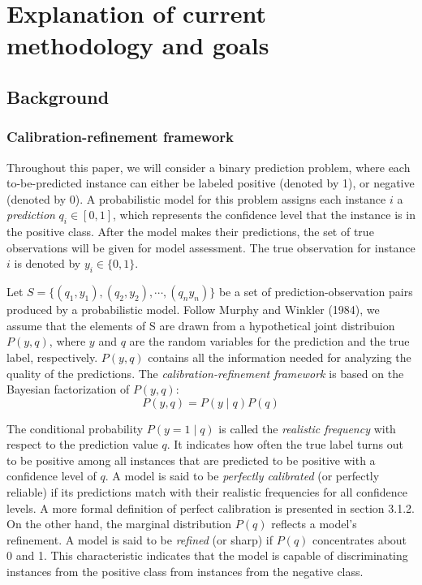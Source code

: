 \chapter{Explanation of current methodology and goals}
\section{Background}

\subsection{Calibration-refinement framework}

Throughout this paper, we will consider a binary prediction problem, where each to-be-predicted instance can either be labeled positive (denoted by 1), or negative (denoted by 0). A probabilistic model for this problem assigns each instance $i$ a \textit{prediction} $q_i \in [0, 1]$, which represents the confidence level that the instance is in the positive class. After the model makes their predictions, the set of true observations will be given for model assessment. The true observation for instance $i$ is denoted by $y_i \in \{0, 1\}$.  

Let $S = \{(q_1, y_1), (q_2, y_2), \cdots, (q_n y_n)\}$ be a set of prediction-observation pairs produced by a probabilistic model. Follow Murphy and Winkler (1984), we assume that the elements of S are drawn from a hypothetical joint distribuion $P(y, q)$, where $y$ and $q$ are the random variables for the prediction and the true label, respectively. $P(y, q)$ contains all the information needed for analyzing the quality of the predictions. The \textit{calibration-refinement framework} is based on the Bayesian factorization of $P(y, q)$:
\begin{equation}
  P(y, q) = P(y \mid q)P(q)
  \label{eqn:calib-ref-factor}
\end{equation}

The conditional probability $P(y = 1 \mid q)$ is called the \textit{realistic frequency} with respect to the prediction value $q$. It indicates how often the true label turns out to be positive among all instances that are predicted to be positive with a confidence level of $q$. A model is said to be \textit{perfectly calibrated} (or perfectly reliable) if its predictions match with their realistic frequencies for all confidence levels. A more formal definition of perfect calibration is presented in section 3.1.2. On the other hand, the marginal distribution $P(q)$ reflects a model's refinement. A model is said to be \textit{refined} (or sharp) if $P(q)$ concentrates about 0 and 1. This characteristic indicates that the model is capable of discriminating instances from the positive class from instances from the negative class.   

